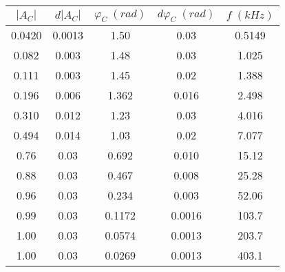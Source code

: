 \begin{tabular}{cc|cc|c}
\toprule
$|A_{C}|$ & $d|A_{C}|$ & $\varphi_{C} \; (rad)$ & $d\varphi_{C} \; (rad)$ & $f \; (kHz)$ \\
\midrule
   0.0420 &     0.0013 &                   1.50 &                    0.03 &       0.5149 \\
    0.082 &      0.003 &                   1.48 &                    0.03 &        1.025 \\
    0.111 &      0.003 &                   1.45 &                    0.02 &        1.388 \\
    0.196 &      0.006 &                  1.362 &                   0.016 &        2.498 \\
    0.310 &      0.012 &                   1.23 &                    0.03 &        4.016 \\
    0.494 &      0.014 &                   1.03 &                    0.02 &        7.077 \\
     0.76 &       0.03 &                  0.692 &                   0.010 &        15.12 \\
     0.88 &       0.03 &                  0.467 &                   0.008 &        25.28 \\
     0.96 &       0.03 &                  0.234 &                   0.003 &        52.06 \\
     0.99 &       0.03 &                 0.1172 &                  0.0016 &        103.7 \\
     1.00 &       0.03 &                 0.0574 &                  0.0013 &        203.7 \\
     1.00 &       0.03 &                 0.0269 &                  0.0013 &        403.1 \\
\bottomrule
\end{tabular}
